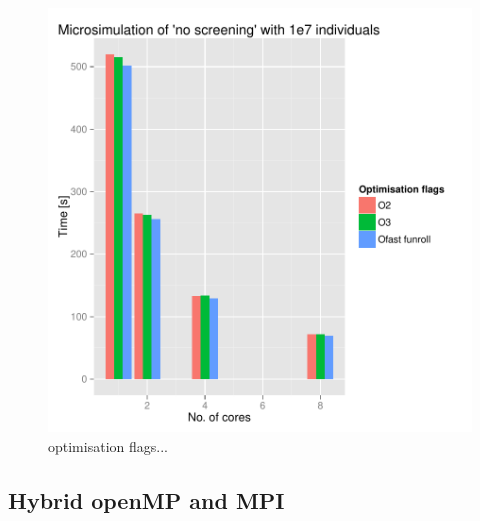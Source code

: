 \begin{figure}[!htbp] \centering
  \includegraphics[height=0.5\textheight]{images/flagsProfiling.pdf}
  \caption{optimisation flags...}
  \label{fig:flagScaling}
\end{figure}


\subsection{Hybrid openMP and MPI}



